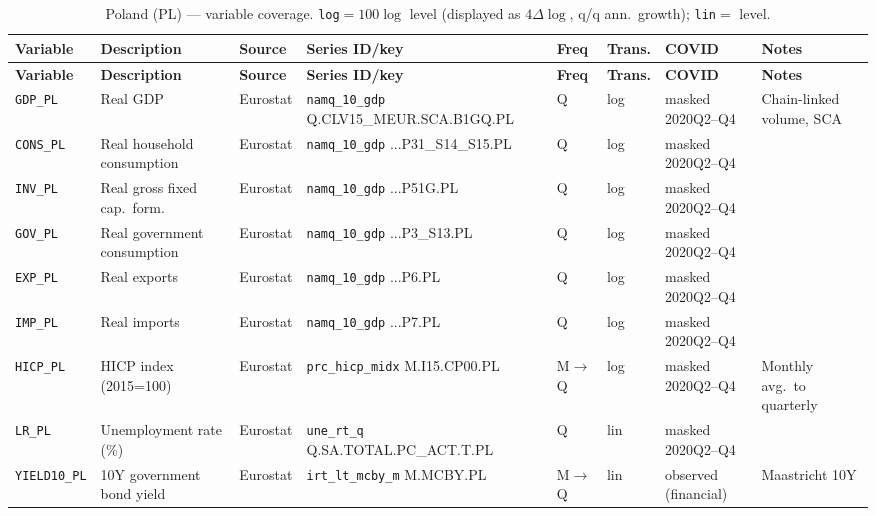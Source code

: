 {\footnotesize
\begin{longtable}{@{}p{2.0cm}p{2.7cm}p{1.4cm}p{2.8cm}p{0.7cm}p{0.85cm}p{1.5cm}p{2.3cm}@{}}
\caption{Poland (PL) --- variable coverage.  \texttt{log}$=100\log$ level
(displayed as $4\Delta\log$, q/q ann.\ growth); \texttt{lin}$=$ level.}
\label{tab:data:PL}\\
\toprule
\textbf{Variable} & \textbf{Description} & \textbf{Source} & \textbf{Series ID/key} & \textbf{Freq} & \textbf{Trans.} & \textbf{COVID} & \textbf{Notes} \\
\midrule \endfirsthead
\toprule
\textbf{Variable} & \textbf{Description} & \textbf{Source} & \textbf{Series ID/key} & \textbf{Freq} & \textbf{Trans.} & \textbf{COVID} & \textbf{Notes} \\
\midrule \endhead
\bottomrule \endfoot
\texttt{GDP\_PL}    & Real GDP                      & Eurostat & \texttt{namq\_10\_gdp} Q.\allowbreak CLV15\_MEUR.\allowbreak SCA.\allowbreak B1GQ.\allowbreak PL        & Q & log & masked 2020Q2--Q4 & Chain-linked volume, SCA \\
\texttt{CONS\_PL}   & Real household consumption    & Eurostat & \texttt{namq\_10\_gdp} ...P31\_S14\_S15.PL              & Q & log & masked 2020Q2--Q4 & \\
\texttt{INV\_PL}    & Real gross fixed cap.\ form.  & Eurostat & \texttt{namq\_10\_gdp} ...P51G.PL                       & Q & log & masked 2020Q2--Q4 & \\
\texttt{GOV\_PL}    & Real government consumption   & Eurostat & \texttt{namq\_10\_gdp} ...P3\_S13.PL                    & Q & log & masked 2020Q2--Q4 & \\
\texttt{EXP\_PL}    & Real exports                  & Eurostat & \texttt{namq\_10\_gdp} ...P6.PL                         & Q & log & masked 2020Q2--Q4 & \\
\texttt{IMP\_PL}    & Real imports                  & Eurostat & \texttt{namq\_10\_gdp} ...P7.PL                         & Q & log & masked 2020Q2--Q4 & \\
\texttt{HICP\_PL}   & HICP index (2015=100)         & Eurostat & \texttt{prc\_hicp\_midx} M.I15.CP00.PL                  & M$\to$Q & log & masked 2020Q2--Q4 & Monthly avg.\ to quarterly \\
\texttt{LR\_PL}     & Unemployment rate (\%)        & Eurostat & \texttt{une\_rt\_q} Q.SA.TOTAL.PC\_ACT.T.PL             & Q & lin & masked 2020Q2--Q4 & \\
\texttt{YIELD10\_PL}& 10Y government bond yield     & Eurostat & \texttt{irt\_lt\_mcby\_m} M.MCBY.PL                     & M$\to$Q & lin & observed (financial) & Maastricht 10Y \\

\end{longtable}}
